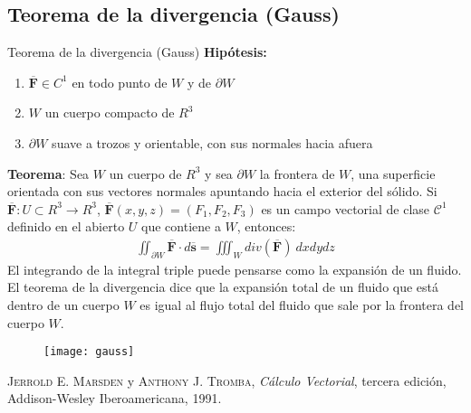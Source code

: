\documentclass[a4paper, twoside]{article}
\numberwithin{equation}{section}
\numberwithin{figure}{section}
\numberwithin{table}{section}
\newcommand{\vect}[1]{\overline{\textbf{#1}}}
\begin{document}
\subsection{Teorema de la divergencia (Gauss)}
\begin{minipage}{0.75\textwidth}
	\begin{teorema*}[0.9\textwidth]{Teorema de la divergencia (Gauss)}
		\textbf{Hipótesis:}
		\begin{enumerate}
			\item $\vect{F} \in C^1$ en todo punto de $W$ y de $\partial W$
			\item $W$ un cuerpo compacto de $R^3$
			\item $\partial W$ suave a trozos y orientable, con sus normales hacia afuera
		\end{enumerate}

		\textbf{Teorema}: Sea $W$ un cuerpo de $R^3$ y sea $\partial W$ la frontera de $W$, una superficie orientada con sus vectores normales apuntando hacia el exterior del sólido. Si $\vect{F}: U \subset R^3 \rightarrow R^3$, $\vect{F}(x,y,z)=(F_1,F_2,F_3)$ es un campo vectorial de clase $\mathcal{C}^1$ definido en el abierto $U$ que contiene a $W$, entonces:
		\begin{align}
			\iint_{\partial W}\vect{F}\cdot d\vect{s}=\iiint_{W}div(\vect{F})\: dxdydz
		\end{align}
		El integrando de la integral triple puede pensarse como la expansión de un fluido. El teorema de la divergencia dice que la expansión total de un fluido que está dentro de un cuerpo $W$ es igual al flujo total del fluido que sale por la frontera del cuerpo $W$.
	\end{teorema*}
\end{minipage}
\begin{minipage}{0.2\textwidth}
	\begin{figure}[H]
		\texttt{[image: gauss]}
	\end{figure}
\end{minipage}

\newpage
\newcommand{\bibliographyname}{Bibliografía} %
\addcontentsline{toc}{section}{\bibliographyname} %
\renewcommand\refname{\bibliographyname} %
\begin{thebibliography}{X}
	 \textsc{Jerrold E. Marsden} y \textsc{Anthony J. Tromba}, \textit{Cálculo Vectorial}, tercera edición, Addison-Wesley Iberoamericana, 1991.
\end{thebibliography}

\makeseccioncolaboradores %

\makehistorial
\end{document}
